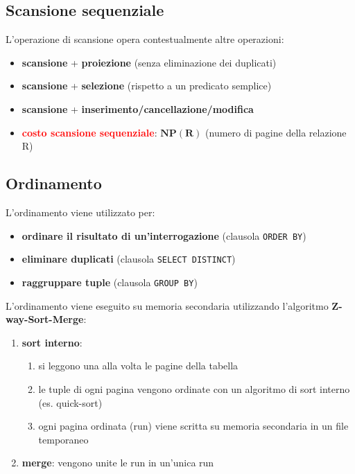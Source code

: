 \subsection{Scansione sequenziale}
L'operazione di scansione opera contestualmente altre operazioni:
\begin{itemize}[label=$\diamond$, itemsep=\smallskipamount]
    \item \textbf{scansione} + \textbf{proiezione} (senza eliminazione dei duplicati)
    \item \textbf{scansione} + \textbf{selezione} (rispetto a un predicato semplice)
    \item \textbf{scansione} + \textbf{inserimento/cancellazione/modifica}
\end{itemize}

\begin{itemize}[label=$\Rightarrow$, itemsep=\smallskipamount]
    \item \textcolor{red}{\textbf{costo scansione sequenziale}}: $\mathbf{NP(R)}$ (numero di pagine della relazione $\mathrm{R}$)
\end{itemize}

\subsection{Ordinamento}
L'ordinamento viene utilizzato per:
\begin{itemize}[label=$\diamond$, itemsep=\smallskipamount]
    \item \textbf{ordinare il risultato di un'interrogazione} (clausola \texttt{ORDER BY})
    \item \textbf{eliminare duplicati} (clausola \texttt{SELECT DISTINCT})
    \item \textbf{raggruppare tuple} (clausola \texttt{GROUP BY})
\end{itemize}

L'ordinamento viene eseguito su memoria secondaria utilizzando l'algoritmo \textbf{Z-way-Sort-Merge}:
\begin{enumerate}[itemsep=\smallskipamount]
    \item \textbf{sort interno}:
    \begin{enumerate}[itemsep=\smallskipamount]
        \item si leggono una alla volta le pagine della tabella
        \item le tuple di ogni pagina vengono ordinate con un algoritmo di sort interno (es. quick-sort)
        \item ogni pagina ordinata (run) viene scritta su memoria secondaria in un file temporaneo 
    \end{enumerate}
    \item \textbf{merge}: vengono unite le run in un'unica run
\end{enumerate}

